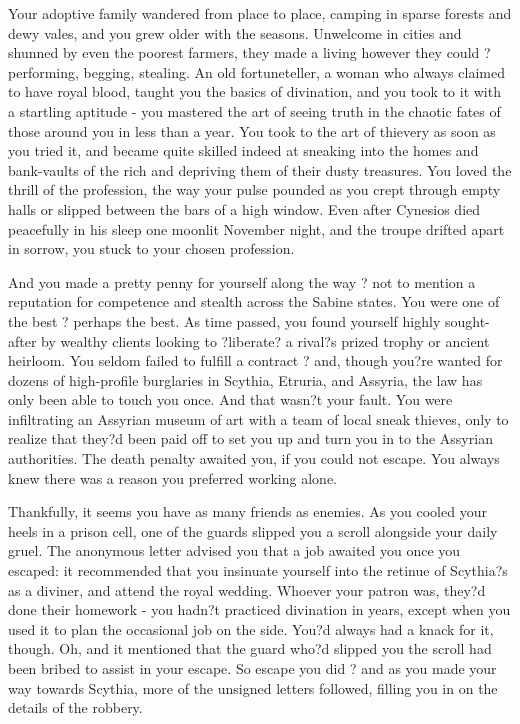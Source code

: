 \documentclass[char]{Kos}
\begin{document}
    Your adoptive family wandered from place to place, camping in sparse forests and dewy vales, and you grew older with the seasons. Unwelcome in cities and shunned by even the poorest farmers, they made a living however they could ? performing, begging, stealing. An old fortuneteller, a woman who always claimed to have royal blood, taught you the basics of divination, and you took to it with a startling aptitude - you mastered the art of seeing truth in the chaotic fates of those around you in less than a year. You took to the art of thievery as soon as you tried it, and became quite skilled indeed at sneaking into the homes and bank-vaults of the rich and depriving them of their dusty treasures. You loved the thrill of the profession, the way your pulse pounded as you crept through empty halls or slipped between the bars of a high window. Even after Cynesios died peacefully in his sleep one moonlit November night, and the troupe drifted apart in sorrow, you stuck to your chosen profession. 

    And you made a pretty penny for yourself along the way ? not to mention a reputation for competence and stealth across the Sabine states. You were one of the best ? perhaps the best. As time passed, you found yourself highly sought-after by wealthy clients looking to ?liberate? a rival?s prized trophy or ancient heirloom. You seldom failed to fulfill a contract ? and, though you?re wanted for dozens of high-profile burglaries in Scythia, Etruria, and Assyria, the law has only been able to touch you once. And that wasn?t your fault. You were infiltrating an Assyrian museum of art with a team of local sneak thieves, only to realize that they?d been paid off to set you up and turn you in to the Assyrian authorities. The death penalty awaited you, if you could not escape. You always knew there was a reason you preferred working alone.

    Thankfully, it seems you have as many friends as enemies. As you cooled your heels in a prison cell, one of the guards slipped you a scroll alongside your daily gruel. The anonymous letter advised you that a job awaited you once you escaped: it recommended that you insinuate yourself into the retinue of Scythia?s \cScythiaKing{\monarch} as a diviner, and attend the royal wedding. Whoever your patron was, they?d done their homework - you hadn?t practiced divination in years, except when you used it to plan the occasional job on the side. You?d always had a knack for it, though. Oh, and it mentioned that the guard who?d slipped you the scroll had been bribed to assist in your escape. So escape you did ? and as you made your way towards Scythia, more of the unsigned letters followed, filling you in on the details of the robbery. 
\end{document}
